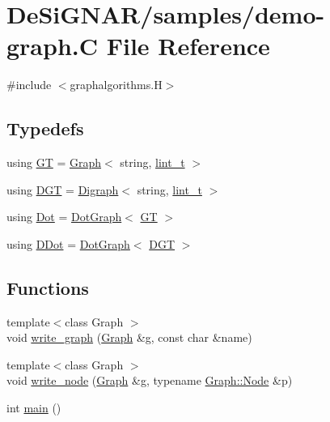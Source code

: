 \hypertarget{demo-graph_8_c}{}\section{De\+Si\+G\+N\+A\+R/samples/demo-\/graph.C File Reference}
\label{demo-graph_8_c}
{\ttfamily \#include $<$graphalgorithms.\+H$>$}\newline
\subsection*{Typedefs}
\begin{DoxyCompactItemize}
\item 
using \hyperlink{demo-graph_8_c_aa29146ba261a2a26fce51cbd8557db3b}{GT} = \hyperlink{class_designar_1_1_graph}{Graph}$<$ string, \hyperlink{namespace_designar_a9d113d66a39e82b73727c72cd3a52f73}{lint\+\_\+t} $>$
\item 
using \hyperlink{demo-graph_8_c_a6b9eddfa4274f215240c1c90be9df2dc}{D\+GT} = \hyperlink{class_designar_1_1_digraph}{Digraph}$<$ string, \hyperlink{namespace_designar_a9d113d66a39e82b73727c72cd3a52f73}{lint\+\_\+t} $>$
\item 
using \hyperlink{demo-graph_8_c_a70657b0b48a4d69ef850be3c5517ecc2}{Dot} = \hyperlink{class_designar_1_1_dot_graph}{Dot\+Graph}$<$ \hyperlink{demo-buildgraph_8_c_a3001c40d2c31ca87ed96cd7d1334a55e}{GT} $>$
\item 
using \hyperlink{demo-graph_8_c_a0ffdd103a7285712ccbd9548ff5544e7}{D\+Dot} = \hyperlink{class_designar_1_1_dot_graph}{Dot\+Graph}$<$ \hyperlink{demo-buildgraph_8_c_ae73e956c2a8cf0a58255aa6b659985e0}{D\+GT} $>$
\end{DoxyCompactItemize}
\subsection*{Functions}
\begin{DoxyCompactItemize}
\item 
{\footnotesize template$<$class Graph $>$ }\\void \hyperlink{demo-graph_8_c_a75dee8f1e6289c0fbd2060e643605bfe}{write\+\_\+graph} (\hyperlink{class_designar_1_1_graph}{Graph} \&g, const char \&name)
\item 
{\footnotesize template$<$class Graph $>$ }\\void \hyperlink{demo-graph_8_c_abe260b66e94b606f11fd75beedd0f6dc}{write\+\_\+node} (\hyperlink{class_designar_1_1_graph}{Graph} \&g, typename \hyperlink{class_designar_1_1_graph_a5dfc7dba9d092ac489c72e40390c37d0}{Graph\+::\+Node} \&p)
\item 
int \hyperlink{demo-graph_8_c_ae66f6b31b5ad750f1fe042a706a4e3d4}{main} ()
\end{DoxyCompactItemize}


